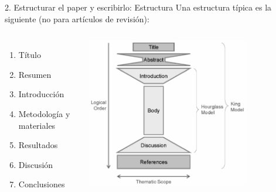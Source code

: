 \documentclass[
10pt,
aspectratio=169,
]{beamer}
\begin{document}
\begin{frame}{2. Estructurar el paper y escribirlo: Estructura}
Una estructura típica es la siguiente (no para artículos de revisi\'on):
\begin{columns}
\begin{enumerate}
\item T\'itulo
\item Resumen
\item Introducci\'on
\item Metodolog\'ia y materiales
\item Resultados
\item Discusi\'on
\item Conclusiones
\end{enumerate}
\centering
\includegraphics[width=0.74\textwidth]{fi1.png}
\end{columns}
\end{frame}
\end{document}
